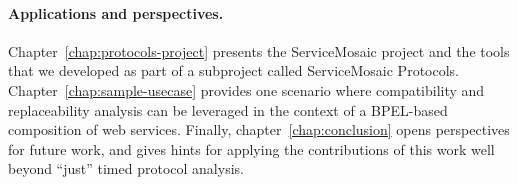 \paragraph{Applications and perspectives.}
Chapter~\ref{chap:protocols-project} presents the ServiceMosaic project and the tools that we developed as part of a subproject called ServiceMosaic Protocols. Chapter~\ref{chap:sample-usecase} provides one scenario where compatibility and replaceability analysis can be leveraged in the context of a BPEL-based composition of web services. Finally, chapter~\ref{chap:conclusion} opens perspectives for future work, and gives hints for applying the contributions of this work well beyond ``just'' timed protocol analysis.
